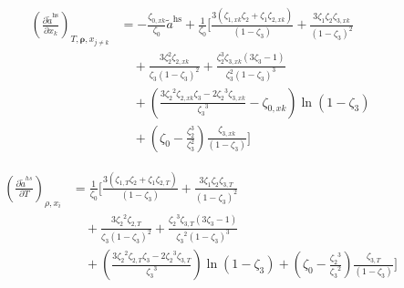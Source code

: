 \documentclass[12pt, letterpaper]{article}
\begin{document}
\begin{equation}
    \begin{aligned}
        \left(\frac{\partial\tilde{a}^{\mathrm{hs}}}{\partial x_{k}}\right)_{T,\boldsymbol{\rho},x_{j\neq k}}
        &=- \frac{\zeta_{0,xk}}{\zeta_{0}}\tilde{a}^{\mathrm{hs}}+\frac{1}{\zeta_{0}}\biggl[
        \frac{3(\zeta_{1,xk}\zeta_{2}+\zeta_{1}\zeta_{2,xk})}{(1-\zeta_{3})}
        +\frac{3\zeta_{1}\zeta_{2}\zeta_{3,xk}}{\left(1-\zeta_{3}\right)^{2}}
        \\
        &\quad +\frac{3\zeta_{2}^{2}\zeta_{2,xk}}{\zeta_{3}(1-\zeta_{3})^{2}}
        +\frac{\zeta_{2}^{3}\zeta_{3,xk}(3\zeta_{3}-1)}{\zeta_{3}^{2}(1-\zeta_{3})^{3}}
        \\
        &\quad +\left(
        \frac{3{\zeta_{2}}^{2}{\zeta_{2,xk}}{\zeta_{3}}-2{\zeta_{2}}^{3}{\zeta_{3,xk}}}{{\zeta_{3}}^{3}}
        -{\zeta_{0,xk}}
        \right)\ln(1-{\zeta_{3}})
        \\
        &\quad +\left(\zeta_{0}-\frac{\zeta_{2}^{3}}{\zeta_{3}^{2}}\right)\frac{\zeta_{3,xk}}{(1-\zeta_{3})}
        \biggr]
    \end{aligned}
    \label{eq:hs_ares_dxk}
\end{equation}


\begin{equation}
    \begin{aligned}
        \left(\frac{\partial\tilde{a}^{hs}}{\partial T}\right)_{\rho,x_{i}}
        &=\frac{1}{\zeta_{0}}\Bigg[
        \frac{3(\zeta_{1,T}\zeta_{2}+\zeta_{1}\zeta_{2,T})}{(1-\zeta_{3})}
        +\frac{3\zeta_{1}\zeta_{2}\zeta_{3,T}}{(1-\zeta_{3})^{2}}
        \\
        &\quad
        +\frac{3{\zeta_{2}}^{2}{\zeta_{2,T}}}{\zeta_{3}{(1-\zeta_{3})}^{2}}
        +\frac{{\zeta_{2}}^{3}{\zeta_{3,T}}(3{\zeta_{3}}-1)}{{\zeta_{3}}^{2}{(1-\zeta_{3})}^{3}}
        \\
        &\quad
        +\left(\frac{3{\zeta_{2}}^{2}{\zeta_{2,T}}{\zeta_{3}}-2{\zeta_{2}}^{3}{\zeta_{3,T}}}{{\zeta_{3}}^{3}}\right)\ln(1-{\zeta_{3}})
        +\left({\zeta_{0}}-\frac{{\zeta_{2}}^{3}}{{\zeta_{3}}^{2}}\right)\frac{\zeta_{3,T}}{(1-\zeta_{3})}
        \Bigg]
    \end{aligned}
    \label{eq:hs_ares_dT}
\end{equation}
\end{document}
